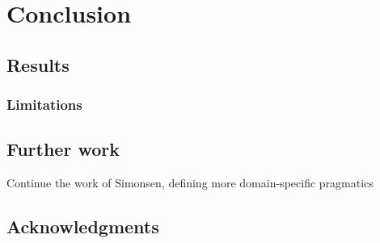\chapter{Conclusion}
\label{chap:conclusion}


\section{Results}

\subsection{Limitations}

\section{Further work}

Continue the work of Simonsen, defining more domain-specific pragmatics

\section{Acknowledgments}
